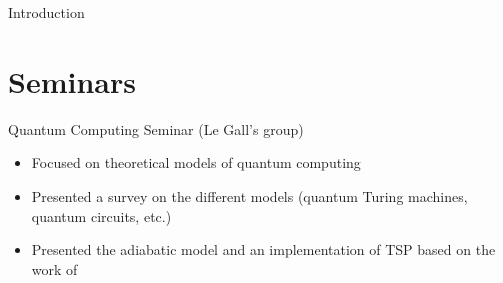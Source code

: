 \documentclass{beamer}
\begin{document}
\begin{frame}{Introduction}
\begin{block}{}
   \end{block}
\end{frame}


\section{Seminars}
\begin{frame}{Quantum Computing Seminar (Le Gall's group)}
   \begin{itemize}
      \item Focused on theoretical models of quantum computing
      \item Presented a survey on the different models (quantum Turing machines, quantum circuits, etc.)
      \item Presented the adiabatic model and an implementation of TSP based on the work of ~\parencite{Kieu_2019}
   \end{itemize}
\end{frame}
\end{document}
